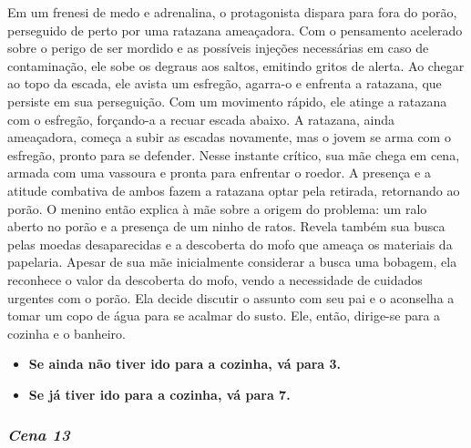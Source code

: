 Em um frenesi de medo e adrenalina, o protagonista dispara para fora do porão, perseguido de perto por uma ratazana ameaçadora. Com o pensamento acelerado sobre o perigo de ser mordido e as possíveis injeções necessárias em caso de contaminação, ele sobe os degraus aos saltos, emitindo gritos de alerta. Ao chegar ao topo da escada, ele avista um esfregão, agarra-o e enfrenta a ratazana, que persiste em sua perseguição. Com um movimento rápido, ele atinge a ratazana com o esfregão, forçando-a a recuar escada abaixo. A ratazana, ainda ameaçadora, começa a subir as escadas novamente, mas o jovem se arma com o esfregão, pronto para se defender. Nesse instante crítico, sua mãe chega em cena, armada com uma vassoura e pronta para enfrentar o roedor. A presença e a atitude combativa de ambos fazem a ratazana optar pela retirada, retornando ao porão. O menino então explica à mãe sobre a origem do problema: um ralo aberto no porão e a presença de um ninho de ratos. Revela também sua busca pelas moedas desaparecidas e a descoberta do mofo que ameaça os materiais da papelaria. Apesar de sua mãe inicialmente considerar a busca uma bobagem, ela reconhece o valor da descoberta do mofo, vendo a necessidade de cuidados urgentes com o porão. Ela decide discutir o assunto com seu pai e o aconselha a tomar um copo de água para se acalmar do susto. Ele, então, dirige-se para a cozinha e o banheiro.

\begin{itemize}
	\item \textbf{Se ainda não tiver ido para a cozinha, vá para 3.}
	\item \textbf{Se já tiver ido para a cozinha, vá para 7.}
\end{itemize}

\bigskip\medskip

\subsubsection*{\textit{\textbf{Cena 13}}}

